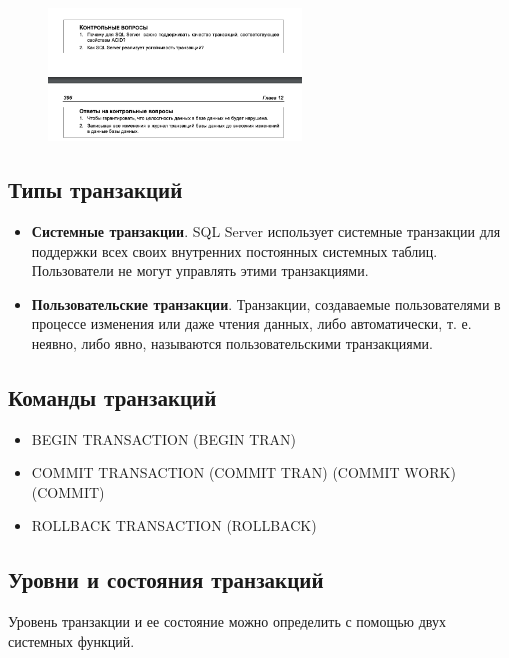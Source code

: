 \begin{figure}[h!]
	\begin{center}
		\includegraphics[width=0.6\textwidth]{img/control28.png}
	\end{center}
	\captionsetup{justification=centering}
\end{figure}


\subsection{Типы транзакций}

\begin{itemize}
	\item \textbf{Системные транзакции}. SQL Server использует системные транзакции для поддержки всех своих внутренних постоянных системных таблиц. Пользователи не могут управлять этими транзакциями. 
	\item \textbf{Пользовательские транзакции}. Транзакции, создаваемые пользователями в процессе изменения или даже чтения данных, либо автоматически, т. е. неявно, либо явно, называются пользовательскими транзакциями.
\end{itemize}

\subsection{Команды транзакций}

\begin{itemize}
	\item BEGIN TRANSACTION (BEGIN TRAN)
	\item COMMIT TRANSACTION (COMMIT TRAN) (COMMIT WORK) (COMMIT)
	\item ROLLBACK TRANSACTION (ROLLBACK)
\end{itemize}

\subsection{Уровни и состояния транзакций}

Уровень транзакции и ее состояние можно определить с помощью двух системных
функций. 

